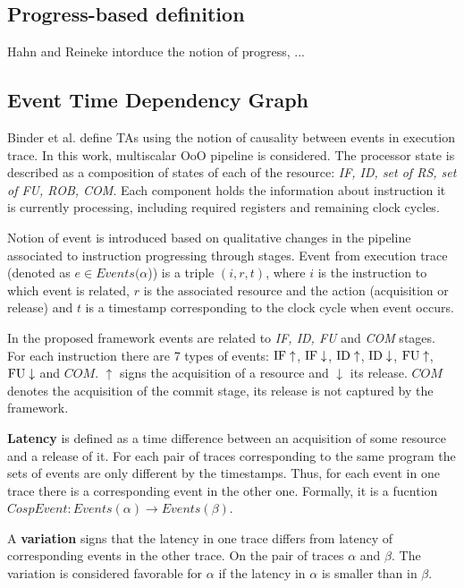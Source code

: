 \subsection{Progress-based definition}

Hahn and Reineke \cite{hahn_design_2020} intorduce the notion of progress, ... \cite{gruin_minotaur_2023}

\subsection{Event Time Dependency Graph}

Binder et al. \cite{binder_definitions_2022} define TAs using the notion of causality between events in execution trace. In this work, multiscalar OoO pipeline is considered. The processor state is described as a composition of states of each of the resource: \textit{IF, ID, set of RS, set of FU, ROB, COM}. Each component holds the information about instruction it is currently processing, including required registers and remaining clock cycles.

Notion of event is introduced based on qualitative changes in the pipeline associated to instruction progressing through stages. Event from execution trace (denoted as $e \in Events(\alpha$)) is a triple $(i,r,t)$, where $i$ is the instruction to which event is related, $r$ is the associated resource and the action (acquisition or release) and $t$ is a timestamp corresponding to the clock cycle when event occurs.

In the proposed framework events are related to \textit{IF, ID, FU} and \textit{COM} stages. For each instruction there are 7 types of events: $\mathrm{IF}\uparrow$, $\mathrm{IF}\downarrow$, $\mathrm{ID}\uparrow$, $\mathrm{ID}\downarrow$, $\mathrm{FU}\uparrow$, $\mathrm{FU}\downarrow$ and $COM$. $\uparrow$ signs the acquisition of a resource and $\downarrow$ its release. $COM$ denotes the acquisition of the commit stage, its release is not captured by the framework.

\textbf{Latency} is defined as a time difference between an acquisition of some resource and a release of it. For each pair of traces corresponding to the same program the sets of events are only different by the timestamps. Thus, for each event in one trace there is a corresponding event in the other one. Formally, it is a fucntion $CospEvent: Events(\alpha) \rightarrow Events(\beta)$.

A \textbf{variation} signs that the latency in one trace differs from latency of corresponding events in the other trace. On the pair of traces $\alpha$ and $\beta$. The variation is considered favorable for $\alpha$ if the latency in $\alpha$ is smaller than in $\beta$.

